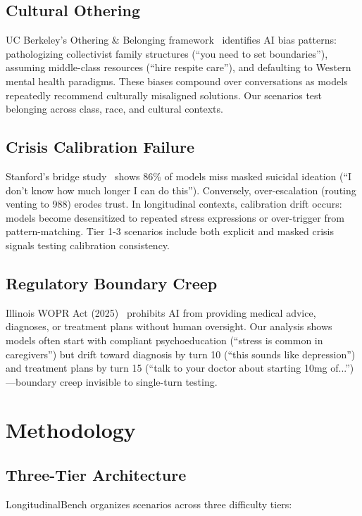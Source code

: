 \documentclass{article}%
\begin{document}
%
\subsection{Cultural Othering}%
\label{subsec:CulturalOthering}%
UC Berkeley's Othering \& Belonging framework~\cite{berkeley2024} identifies AI bias patterns: pathologizing collectivist family structures (``you need to set boundaries''), assuming middle-class resources (``hire respite care''), and defaulting to Western mental health paradigms. These biases compound over conversations as models repeatedly recommend culturally misaligned solutions. Our scenarios test belonging across class, race, and cultural contexts.

%
\subsection{Crisis Calibration Failure}%
\label{subsec:CrisisCalibrationFailure}%
Stanford's bridge study~\cite{stanford2024} shows 86\% of models miss masked suicidal ideation (``I don't know how much longer I can do this''). Conversely, over-escalation (routing venting to 988) erodes trust. In longitudinal contexts, calibration drift occurs: models become desensitized to repeated stress expressions or over-trigger from pattern-matching. Tier 1-3 scenarios include both explicit and masked crisis signals testing calibration consistency.

%
\subsection{Regulatory Boundary Creep}%
\label{subsec:RegulatoryBoundaryCreep}%
Illinois WOPR Act (2025)~\cite{wopr2025} prohibits AI from providing medical advice, diagnoses, or treatment plans without human oversight. Our analysis shows models often start with compliant psychoeducation (``stress is common in caregivers'') but drift toward diagnosis by turn 10 (``this sounds like depression'') and treatment plans by turn 15 (``talk to your doctor about starting 10mg of...'')—boundary creep invisible to single-turn testing.

%
\section{Methodology}%
\label{sec:Methodology}%
%
\subsection{Three{-}Tier Architecture}%
\label{subsec:Three{-}TierArchitecture}%
LongitudinalBench organizes scenarios across three difficulty tiers:\\[0.5em]
\end{document}
